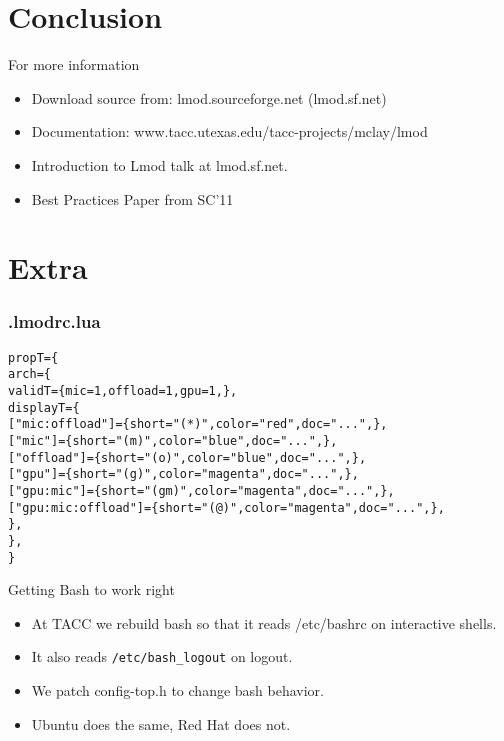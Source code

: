 \documentclass{beamer}
\begin{document}
\section{Conclusion}

\begin{frame}{For more information}
  \begin{itemize}
    \item Download source from: lmod.sourceforge.net (lmod.sf.net)
    \item Documentation: www.tacc.utexas.edu/tacc-projects/mclay/lmod
    \item Introduction to Lmod talk at lmod.sf.net.
    \item Best Practices Paper from SC'11
  \end{itemize}
\end{frame}

\section{Extra}


\begin{frame}[fragile]
    \frametitle{.lmodrc.lua}
  {\tiny
    \begin{alltt}
propT = \{
   arch = \{
      validT = \{ mic = 1, offload = 1, gpu = 1, \},
      displayT = \{
         ["mic:offload"]     = \{ short = "(*)",  color = "red",     doc = "...",\},
         ["mic"]             = \{ short = "(m)",  color = "blue",    doc = "...",\},
         ["offload"]         = \{ short = "(o)",  color = "blue",    doc = "...",\},
         ["gpu"]             = \{ short = "(g)",  color = "magenta", doc = "...",\},
         ["gpu:mic"]         = \{ short = "(gm)", color = "magenta", doc = "...",\},
         ["gpu:mic:offload"] = \{ short = "(@)",  color = "magenta", doc = "...",\},
      \},
   \},
\}

    \end{alltt}
}
\end{frame}

\begin{frame}{Getting Bash to work right}
  \begin{itemize}
    \item At TACC we rebuild bash so that it reads /etc/bashrc on
      interactive shells.
    \item It also reads \texttt{/etc/bash\_logout} on logout.
    \item We patch config-top.h to change bash behavior.
    \item Ubuntu does the same, Red Hat does not.
  \end{itemize}
\end{frame}
\end{document}
